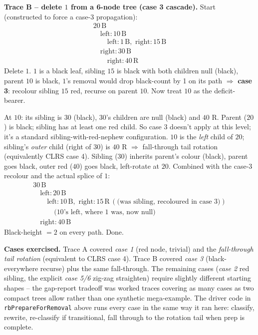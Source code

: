 \documentclass[11pt]{article}
\begin{document}
\begin{examplebox}
\textbf{Trace B -- delete $1$ from a 6-node tree (case 3 cascade).}
Start (constructed to force a case-3 propagation):
\[
\begin{array}{l}
20\,\text{B} \\
\quad \text{left}: 10\,\text{B} \\
\qquad \text{left}: 1\,\text{B},\,\, \text{right}: 15\,\text{B} \\
\quad \text{right}: 30\,\text{B} \\
\qquad \text{right}: 40\,\text{R}
\end{array}
\]
Delete $1$. $1$ is a black leaf, sibling $15$ is black with both
children null (black), parent $10$ is black, $1$'s removal would
drop black-count by 1 on its path $\Rightarrow$ \textbf{case 3}:
recolour sibling $15$ red, recurse on parent $10$. Now treat $10$
as the deficit-bearer.

At $10$: its sibling is $30$ (black), $30$'s children are null
(black) and $40$ R. Parent ($20$) is black; sibling has at least
one red child. So case 3 doesn't apply at this level; it's a
standard sibling-with-red-nephew configuration. $10$ is the
\emph{left} child of $20$; sibling's \emph{outer} child (right of
$30$) is $40$ R $\Rightarrow$ fall-through tail rotation
(equivalently CLRS case 4). Sibling ($30$) inherits parent's
colour (black), parent goes black, outer red ($40$) goes black,
left-rotate at $20$. Combined with the case-3 recolour and the
actual splice of $1$:
\[
\begin{array}{l}
30\,\text{B} \\
\quad \text{left}: 20\,\text{B} \\
\qquad \text{left}: 10\,\text{B},\,\, \text{right}: 15\,\text{R}\,(\text{(was sibling, recoloured in case 3)}) \\
\qquad\quad \text{(}10\text{'s left, where }1\text{ was, now null)} \\
\quad \text{right}: 40\,\text{B}
\end{array}
\]
Black-height $= 2$ on every path. Done.

\textbf{Cases exercised.} Trace A covered \emph{case 1}
(red node, trivial) and the \emph{fall-through tail rotation}
(equivalent to CLRS case 4). Trace B covered \emph{case 3}
(black-everywhere recurse) plus the same fall-through. The
remaining cases (\emph{case 2} red sibling, the explicit
\emph{case 5/6} zig-zag straighten) require slightly different
starting shapes -- the gap-report tradeoff was worked traces
covering as many cases as two compact trees allow rather than
one synthetic mega-example. The driver code in
\texttt{rbPrepareForRemoval} above runs every case in the same
way it ran here: classify, rewrite, re-classify if transitional,
fall through to the rotation tail when prep is complete.
\end{examplebox}
\end{document}
